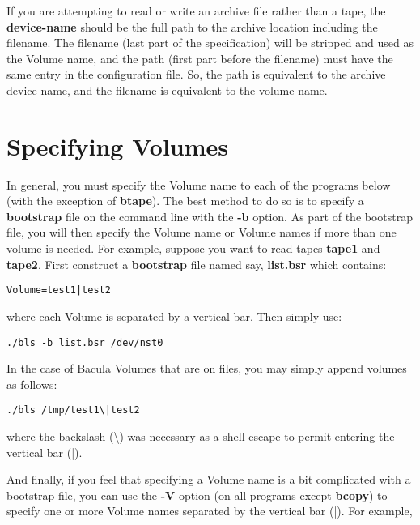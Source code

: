 If you are attempting to read or write an archive file rather than a tape, the
{\bf device-name} should be the full path to the archive location including
the filename. The filename (last part of the specification) will be stripped
and used as the Volume name, and the path (first part before the filename)
must have the same entry in the configuration file. So, the path is equivalent
to the archive device name, and the filename is equivalent to the volume name.


\section{Specifying Volumes}

In general, you must specify the Volume name to each of the programs below
(with the exception of {\bf btape}). The best method to do so is to specify a
{\bf bootstrap} file on the command line with the {\bf -b} option. As part of
the bootstrap file, you will then specify the Volume name or Volume names if
more than one volume is needed. For example, suppose you want to read tapes
{\bf tape1} and {\bf tape2}. First construct a {\bf bootstrap} file named say,
{\bf list.bsr} which contains: 

\footnotesize
\begin{verbatim}
Volume=test1|test2
\end{verbatim}
\normalsize

where each Volume is separated by a vertical bar. Then simply use: 

\footnotesize
\begin{verbatim}
./bls -b list.bsr /dev/nst0
\end{verbatim}
\normalsize

In the case of Bacula Volumes that are on files, you may simply append volumes
as follows: 

\footnotesize
\begin{verbatim}
./bls /tmp/test1\|test2
\end{verbatim}
\normalsize

where the backslash (\textbackslash{}) was necessary as a shell escape to
permit entering the vertical bar (|). 

And finally, if you feel that specifying a Volume name is a bit complicated
with a bootstrap file, you can use the {\bf -V} option (on all programs except
{\bf bcopy}) to specify one or more Volume names separated by the vertical bar
(|). For example, 

